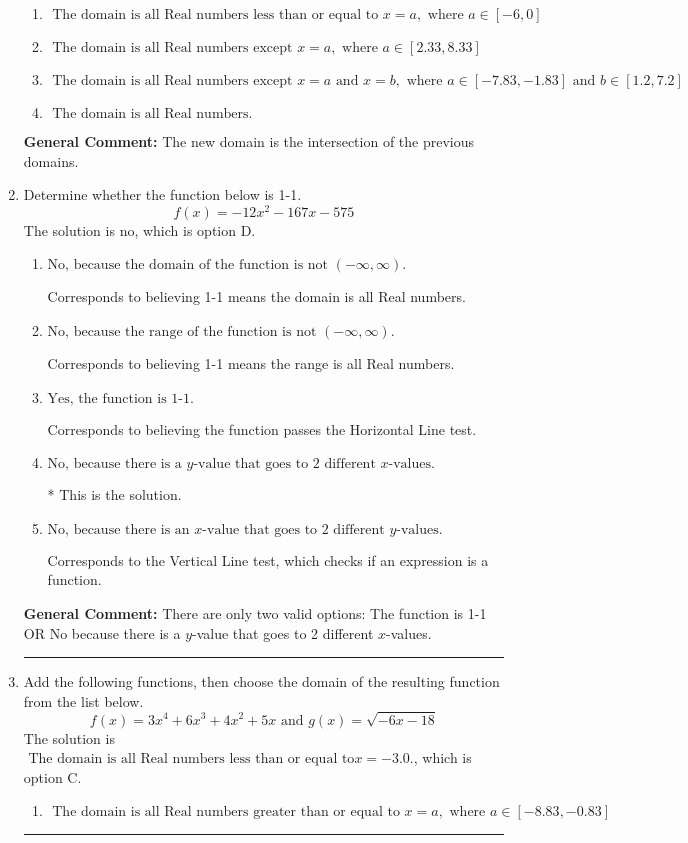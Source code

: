 \documentclass{extbook}[14pt]
\newcommand{\litem}[1]{\item #1

\rule{\textwidth}{0.4pt}}
\begin{document}
\begin{enumerate}
{\begin{enumerate}[label=\Alph*.]
\item \( \text{ The domain is all Real numbers less than or equal to } x = a, \text{ where } a \in [-6, 0] \)


\item \( \text{ The domain is all Real numbers except } x = a, \text{ where } a \in [2.33, 8.33] \)


\item \( \text{ The domain is all Real numbers except } x = a \text{ and } x = b, \text{ where } a \in [-7.83, -1.83] \text{ and } b \in [1.2, 7.2] \)


\item \( \text{ The domain is all Real numbers. } \)


\end{enumerate}

\textbf{General Comment:} The new domain is the intersection of the previous domains.
}
\litem{
Determine whether the function below is 1-1.
\[ f(x) = -12 x^2 - 167 x - 575 \]The solution is \( \text{no} \), which is option D.\begin{enumerate}[label=\Alph*.]
\item \( \text{No, because the domain of the function is not $(-\infty, \infty)$.} \)

Corresponds to believing 1-1 means the domain is all Real numbers.
\item \( \text{No, because the range of the function is not $(-\infty, \infty)$.} \)

Corresponds to believing 1-1 means the range is all Real numbers.
\item \( \text{Yes, the function is 1-1.} \)

Corresponds to believing the function passes the Horizontal Line test.
\item \( \text{No, because there is a $y$-value that goes to 2 different $x$-values.} \)

* This is the solution.
\item \( \text{No, because there is an $x$-value that goes to 2 different $y$-values.} \)

Corresponds to the Vertical Line test, which checks if an expression is a function.
\end{enumerate}

\textbf{General Comment:} There are only two valid options: The function is 1-1 OR No because there is a $y$-value that goes to 2 different $x$-values.
}
\litem{
Add the following functions, then choose the domain of the resulting function from the list below.
\[ f(x) = 3x^{4} +6 x^{3} +4 x^{2} +5 x \text{ and } g(x) = \sqrt{-6x-18}  \]The solution is \( \text{ The domain is all Real numbers less than or equal to} x = -3.0. \), which is option C.\begin{enumerate}[label=\Alph*.]
\item \( \text{ The domain is all Real numbers greater than or equal to } x = a, \text{ where } a \in [-8.83, -0.83] \)



\end{enumerate}}
\end{enumerate}
\end{document}
